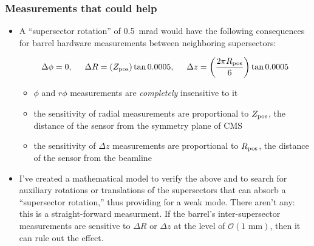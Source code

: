 \documentclass[compress]{beamer}
\begin{document}
\begin{frame}
\frametitle{Measurements that could help}
\begin{itemize}
\item A ``supersector rotation'' of 0.5~mrad would have the following
  consequences for barrel hardware measurements between neighboring supersectors:

\[ \Delta\phi = 0, \hspace{0.5 cm} \Delta R = \left(Z_{\mbox{\scriptsize pos}}\right) \tan 0.0005, \hspace{0.5 cm} \Delta z = \left(\frac{2\pi R_{\mbox{\scriptsize pos}}}{6}\right) \tan 0.0005 \]

\begin{itemize}
\item $\phi$ and $r\phi$ measurements are {\it completely} insensitive to it
\item the sensitivity of radial measurements are proportional to
  $Z_{\mbox{\scriptsize pos}}$, the distance of the sensor from the
  symmetry plane of CMS
\item the sensitivity of $\Delta z$ measurements are proportional to
  $R_{\mbox{\scriptsize pos}}$, the distance of the sensor from the
  beamline
\end{itemize}

\item I've created a mathematical model to verify the above and to
  search for auxiliary rotations or translations of the supersectors
  that can absorb a ``supersector rotation,'' thus providing for a
  weak mode.  There aren't any: this is a straight-forward measurment.
  If the barrel's inter-supersector measurements are sensitive to
  $\Delta R$ or $\Delta z$ at the level of $\mathcal{O}(\mbox{1 mm})$,
  then it can rule out the effect.
\end{itemize}



\label{numpages}
\end{frame}

\end{document}
